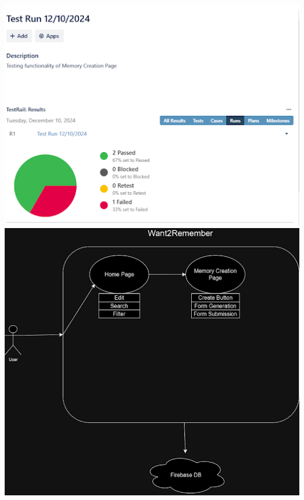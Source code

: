 \documentclass{article}
\begin{document}
\includegraphics{snapshot2img3.png}
\includegraphics{snapshot2img4.png}
\end{document}
